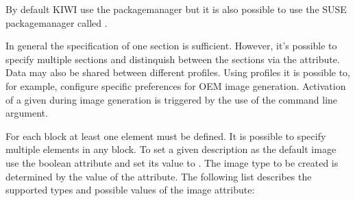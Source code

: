 By default KIWI use the  packagemanager but it is also possible
to use the SUSE packagemanager called . 

In general the specification of one  section is sufficient.
However, it's possible to specify multiple  sections and
distinquish between the sections via the  attribute. Data
may also be shared between different profiles. Using profiles it is possible
to, for example, configure specific preferences for OEM image generation. 
Activation of a given  during image generation is triggered by
the use of the  command line argument.

For each  block at least one  element must be
defined. It is possible to specify multiple  elements in any 
 block. To set a given  description as the default image
use the boolean attribute  and set its value to .
The image type to be created is determined by the value of the 
attribute. The following list describes the supported types and possible
values of the image attribute:

